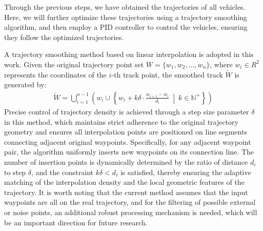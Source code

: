 \documentclass[journal,twoside,web]{ieeecolor}
\begin{document}
Through the previous steps, we have obtained the trajectories of all vehicles. 
Here, we will further optimize these trajectories using a trajectory smoothing algorithm, and then employ a PID controller to control the vehicles, ensuring they follow the optimized trajectories\cite{Alpher22d}. 

A trajectory smoothing method based on linear interpolation is adopted in this work.
Given the original trajectory point set \(W = \{w_1,w_2 ,…,w_n\}\), where \(w_i \in R^2\) represents the coordinates of the \(i\)-th track point, the smoothed track \(\widetilde{W}\) is generated by:
\begin{align}
	\widetilde{W} = \bigcup_{i = 1}^{n-1} \left( w_i \cup \left\{ w_i + k\delta \cdot \frac{w_{i+1} - w_i}{d_i} \ \middle|\ k \in \mathbb{N}^+\right\} \right)
\end{align}
Precise control of trajectory density is achieved through a step size parameter \(\delta\) in this method, which maintains strict adherence to the original trajectory geometry and ensures all interpolation points are positioned on line segments connecting adjacent original waypoints.
Specifically, for any adjacent waypoint pair, the algorithm uniformly inserts new waypoints on its connection line. The number of insertion points is dynamically determined by the ratio of distance \(d_i\) to step \(\delta\), and the constraint \(k\delta < d_i\) is satisfied, thereby ensuring the adaptive matching of the interpolation density and the local geometric features of the trajectory.
It is worth noting that the current method assumes that the input waypoints are all on the real trajectory, and for the filtering of possible external or noise points, an additional robust processing mechanism is needed, which will be an important direction for future research.
\end{document}
